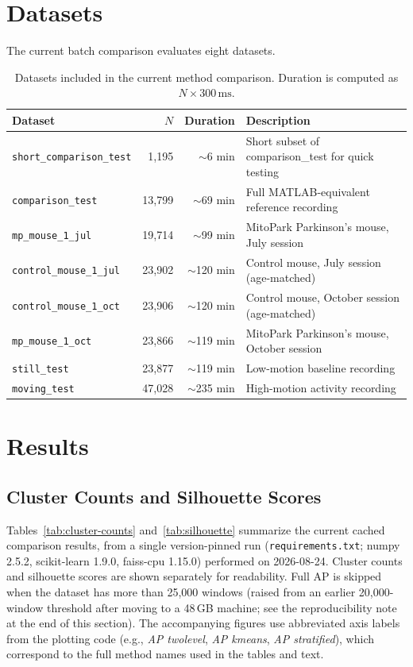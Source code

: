 \documentclass[11pt]{article}
\begin{document}
\FloatBarrier
\section{Datasets}

The current batch comparison evaluates eight datasets.

\begin{table}[h]
\centering
\caption{Datasets included in the current method comparison. Duration is computed as $N \times 300\,\text{ms}$.}
\begin{tabular}{lrrl}
\toprule
Dataset & $N$ & Duration & Description \\
\midrule
\texttt{short\_comparison\_test} & 1,195 & $\sim$6 min & Short subset of comparison\_test for quick testing \\
\texttt{comparison\_test} & 13,799 & $\sim$69 min & Full MATLAB-equivalent reference recording \\
\texttt{mp\_mouse\_1\_jul} & 19,714 & $\sim$99 min & MitoPark Parkinson's mouse, July session \\
\texttt{control\_mouse\_1\_jul} & 23,902 & $\sim$120 min & Control mouse, July session (age-matched) \\
\texttt{control\_mouse\_1\_oct} & 23,906 & $\sim$120 min & Control mouse, October session (age-matched) \\
\texttt{mp\_mouse\_1\_oct} & 23,866 & $\sim$119 min & MitoPark Parkinson's mouse, October session \\
\texttt{still\_test} & 23,877 & $\sim$119 min & Low-motion baseline recording \\
\texttt{moving\_test} & 47,028 & $\sim$235 min & High-motion activity recording \\
\bottomrule
\end{tabular}
\end{table}

\FloatBarrier
\section{Results}
\label{sec:results}

\subsection{Cluster Counts and Silhouette Scores}

Tables~\ref{tab:cluster-counts} and~\ref{tab:silhouette} summarize the current cached comparison results, from a single version-pinned run (\texttt{requirements.txt}; numpy 2.5.2, scikit-learn 1.9.0, faiss-cpu 1.15.0) performed on 2026-08-24. Cluster counts and silhouette scores are shown separately for readability. Full AP is skipped when the dataset has more than 25,000 windows (raised from an earlier 20,000-window threshold after moving to a 48\,GB machine; see the reproducibility note at the end of this section). The accompanying figures use abbreviated axis labels from the plotting code (e.g., \textit{AP twolevel}, \textit{AP kmeans}, \textit{AP stratified}), which correspond to the full method names used in the tables and text.
\end{document}
